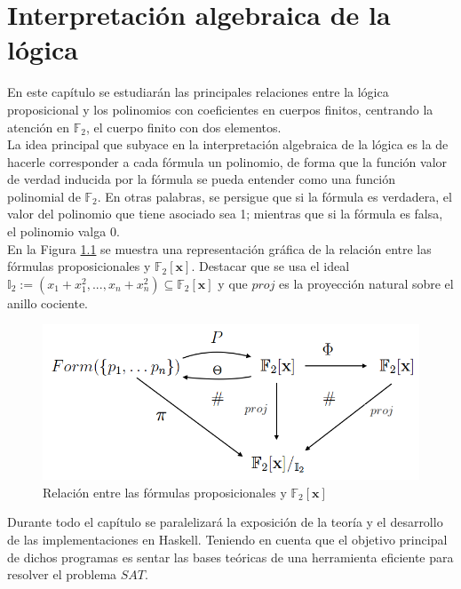 \chapter{Interpretación algebraica de la lógica}\label{sec:interp}

En este capítulo se estudiarán las principales relaciones entre la lógica proposicional y los 
polinomios con coeficientes en cuerpos finitos, centrando la atención en $\mathbb{F}_2$, 
el cuerpo finito con dos elementos.\\

La idea principal que subyace en la interpretación algebraica de la lógica es la de hacerle corresponder a cada fórmula un polinomio, de forma que la función valor de verdad inducida por la fórmula se pueda entender como una función polinomial de $\mathbb{F}_2$. En otras palabras, se persigue que si la fórmula es verdadera, el valor del polinomio que tiene asociado sea 1; mientras que si la fórmula es falsa, el polinomio valga 0.\\

En la Figura \ref{fig:esquema} se muestra una representación gráfica de la relación entre las fórmulas proposicionales y $\mathbb{F}_2[\textbf{x}]$. Destacar que se usa el ideal $\mathbb{I}_2 :=(x_1+x_1^2,...,x_n+x_n^2)\subseteq\mathbb{F}_2[\textbf{x}]$ y que $proj$ es la proyección natural sobre el anillo cociente.

\begin{figure}[h]
	\centering
		\includegraphics[scale=0.46]{imagenes/conmu.png}
	\caption{Relación entre las fórmulas proposicionales y $\mathbb{F}_2[\textbf{x}]$}
	\label{fig:esquema}
\end{figure}

Durante todo el capítulo se paralelizará la exposición de la teoría y el desarrollo de las implementaciones en Haskell. Teniendo en cuenta que el objetivo principal de dichos programas es sentar las bases teóricas de una herramienta eficiente para resolver el problema $SAT$.
\newpage 
 
